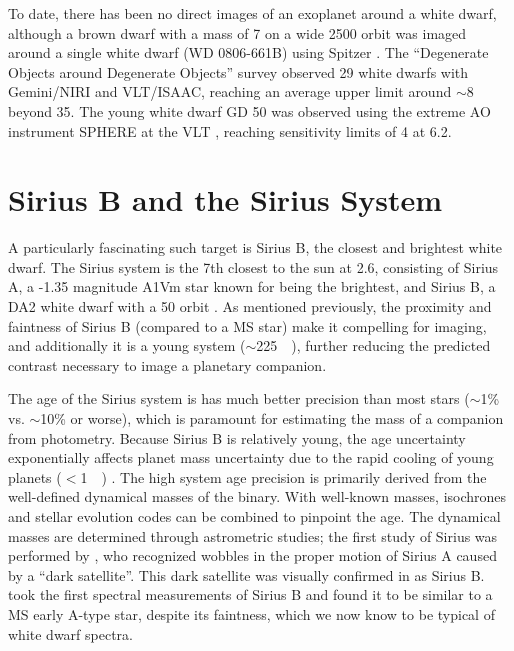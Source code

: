 \documentclass[twocolumn]{aastex631}
\begin{document}
To date, there has been no direct images of an exoplanet around a white dwarf, although a brown dwarf with a mass of \qty{7}{\jupitermass} on a wide \qty{2500}{\au} orbit was imaged around a single white dwarf (WD 0806-661B) using Spitzer \citep{luhman_discovery_2011}. The ``Degenerate Objects around Degenerate Objects'' survey \citep[DODO;][]{hogan_dodo_2009} observed 29 white dwarfs with Gemini/NIRI and VLT/ISAAC, reaching an average upper limit around $\sim$\qty{8}{\jupitermass} beyond \qty{35}{\au}. The young white dwarf GD 50 was observed using the extreme AO instrument SPHERE at the VLT \citep{xu_extreme-ao_2015}, reaching sensitivity limits of \qty{4}{\jupitermass} at \qty{6.2}{\au}.

\section{Sirius B and the Sirius System}

A particularly fascinating such target is Sirius B, the closest and brightest white dwarf. The Sirius system is the 7th closest to the sun at \qty{2.6}{\parsec}, consisting of Sirius A, a -1.35 magnitude A1Vm star known for being the brightest, and Sirius B, a DA2 white dwarf with a \qty{50}{\year} orbit \citep{bond_sirius_2017,gaia_collaboration_gaia_2018}. As mentioned previously, the proximity and faintness of Sirius B (compared to a MS star) make it compelling for imaging, and additionally it is a young system ($\sim$\qty{225}{\mega\year}), further reducing the predicted contrast necessary to image a planetary companion.

The age of the Sirius system is has much better precision than most stars ($\sim$1\% vs. $\sim$10\% or worse), which is paramount for estimating the mass of a companion from photometry. Because Sirius B is relatively young, the age uncertainty exponentially affects planet mass uncertainty due to the rapid cooling of young planets ($<$\qty{1}{\giga\year}) \citep{fortney_giant_2010}. The high system age precision is primarily derived from the well-defined dynamical masses of the binary. With well-known masses, isochrones and stellar evolution codes can be combined to pinpoint the age. The dynamical masses are determined through astrometric studies; the first study of Sirius was performed by \citet{bessel_variations_1844}, who recognized wobbles in the proper motion of Sirius A caused by a ``dark satellite''. This dark satellite was visually confirmed in \citet{bond_companion_1862} as Sirius B. \citet{adams_spectrum_1915} took the first spectral measurements of Sirius B and found it to be similar to a MS early A-type star, despite its faintness, which we now know to be typical of white dwarf spectra.
\end{document}
